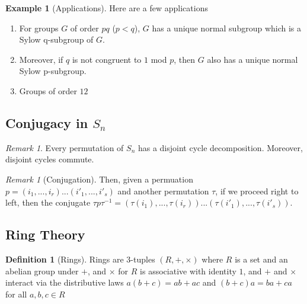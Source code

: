 \documentclass[12pt]{article}
\theoremstyle{definition}
\newtheorem{defn}[thm]{Definition}
\newtheorem{eg}[thm]{Example}
\theoremstyle{remark}
\newtheorem{rmk}[thm]{Remark}
\numberwithin{equation}{section}
\begin{document}
\vspace{15pt}


\begin{eg}[Applications]
        Here are a few applications \begin{enumerate}
                \item For groups $G$ of order $pq$ ($p < q$), $G$ has a unique normal subgroup which is a Sylow q-subgroup of $G$.
                \item Moreover, if $q$ is not congruent to $1$ mod $p$, then $G$ also has a unique normal Sylow p-subgroup.
                \item Groups of order $12$
        \end{enumerate}
\end{eg}


\vspace{15pt}


\subsection{Conjugacy in $S_n$}


\begin{rmk}
        Every permutation of $S_n$ has a disjoint cycle decomposition. Moreover, disjoint cycles commute.
\end{rmk}


\vspace{15pt}


\begin{rmk}[Conjugation]
        Then, given a permuation $p = (i_1,...,i_r)...(i'_1,...,i'_s)$ and another permutation $\tau$, if we proceed right to left, then the conjugate $\tau p \tau^{-1} = (\tau(i_1),...,\tau(i_r))...(\tau(i'_1),...,\tau(i'_s))$.
\end{rmk}

\vspace{15pt}

\subsection{Ring Theory}

\begin{defn}[Rings]
        Rings are 3-tuples $(R,+,\times)$ where $R$ is a set and an abelian group under $+$, and $\times$ for $R$ is associative with identity $1$, and $+$ and $\times$ interact via the distributive laws $a(b+c) = ab+ac$ and $(b+c)a = ba+ca$ for all $a,b,c \in R$
\end{defn}
\end{document}
